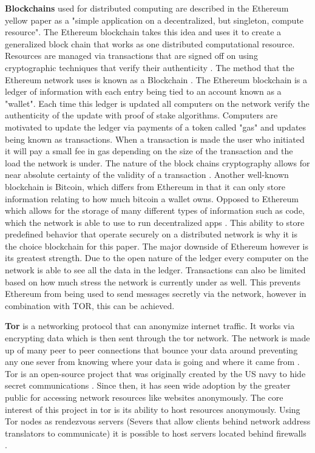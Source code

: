 \documentclass[../main/main.tex]{subfiles}
\begin{document}
\textbf{Blockchains} used for distributed computing are described in the Ethereum yellow paper\cite{ETH} as a "simple application on a decentralized, but singleton, compute resource". 
The Ethereum blockchain takes this idea and uses it to create a generalized block chain that works as one distributed computational resource. 
Resources are managed via transactions that are signed off on using cryptographic techniques that verify their authenticity \cite{ETH} . 
The method that the Ethereum network uses is known as a Blockchain \cite{ETH}. 
The Ethereum blockchain is a ledger of information with each entry being tied to an account known as a "wallet". 
Each time this ledger is updated all computers on the network verify the authenticity of the update with proof of stake algorithms. 
Computers are motivated to update the ledger via payments of a token called "gas" \cite{ETH} and updates being known as transactions. 
When a transaction is made the user who initiated it will pay a small fee in gas depending on the size of the transaction and the load the network is under. 
The nature of the block chains cryptography allows for near absolute certainty of the validity of a transaction \cite{ETH}. 
Another well-known blockchain is Bitcoin, which differs from Ethereum in that it can only store information relating to how much bitcoin a wallet owns. 
Opposed to Ethereum which allows for the storage of many different types of information such as code, which the network is able to use to run decentralized apps \cite{ETH}. 
This ability to store predefined behavior that operate securely on a distributed network is why it is the choice blockchain for this paper. 
The major downside of Ethereum however is its greatest strength. 
Due to the open nature of the ledger every computer on the network is able to see all the data in the ledger. 
Transactions can also be limited based on how much stress the network is currently under as well. 
This prevents Ethereum from being used to send messages secretly via the network, however in combination with TOR,
this can be achieved.


\textbf{Tor} is a networking protocol that can anonymize internet traffic. 
It works via encrypting data which is then sent through the tor network. 
The network is made up of many peer to peer connections that bounce your data around preventing any one sever from knowing where your data is going and where it came from \cite{TOR}. 
Tor is an open-source project that was originally created by the US navy to hide secret communications \cite{TOR}.
Since then, it has seen wide adoption by the greater public for accessing network resources like websites anonymously. 
The core interest of this project in tor is its ability to host resources anonymously. 
Using Tor nodes as rendezvous servers (Severs that allow clients behind network address translators to communicate) it is possible to host servers located behind firewalls \cite{TOR}. 
\end{document}
